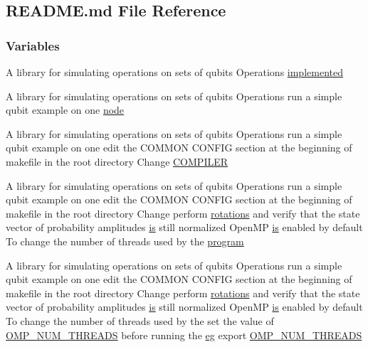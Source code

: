 \hypertarget{README_8md}{
\subsection{README.md File Reference}
\label{README_8md}
}
\subsubsection*{Variables}
\begin{DoxyCompactItemize}
\item 
A library for simulating operations on sets of qubits Operations \hyperlink{README_8md_ac5baa948678e94eb0b3a2aebcb4fa2d5}{implemented}
\item 
A library for simulating operations on sets of qubits Operations run a simple qubit example on one \hyperlink{README_8md_a99a33b7cbd048786ffbadbc8d8996086}{node}
\item 
A library for simulating operations on sets of qubits Operations run a simple qubit example on one edit the COMMON CONFIG section at the beginning of makefile in the root directory Change \hyperlink{README_8md_a91ed524b92d43287f611912bb99ccb2a}{COMPILER}
\item 
A library for simulating operations on sets of qubits Operations run a simple qubit example on one edit the COMMON CONFIG section at the beginning of makefile in the root directory Change perform \hyperlink{README_8md_a168d0f076329da35a2b080049c35cecd}{rotations} and verify that the state vector of probability amplitudes \hyperlink{README_8md_ac361bc388656077907485b42e1531a85}{is} still normalized OpenMP \hyperlink{README_8md_ac361bc388656077907485b42e1531a85}{is} enabled by default To change the number of threads used by the \hyperlink{README_8md_acaf0a093d3b37b72f96f5ff7416daa2c}{program}
\item 
A library for simulating operations on sets of qubits Operations run a simple qubit example on one edit the COMMON CONFIG section at the beginning of makefile in the root directory Change perform \hyperlink{README_8md_a168d0f076329da35a2b080049c35cecd}{rotations} and verify that the state vector of probability amplitudes \hyperlink{README_8md_ac361bc388656077907485b42e1531a85}{is} still normalized OpenMP \hyperlink{README_8md_ac361bc388656077907485b42e1531a85}{is} enabled by default To change the number of threads used by the set the value of \hyperlink{README_8md_ac0f875e6c5b5526a6781e0fbba81e6a4}{OMP\_\-NUM\_\-THREADS} before running the \hyperlink{README_8md_a60a90a09308ad7ec0ea2ac389281518b}{eg} export \hyperlink{README_8md_ac0f875e6c5b5526a6781e0fbba81e6a4}{OMP\_\-NUM\_\-THREADS}

\end{DoxyCompactItemize}
